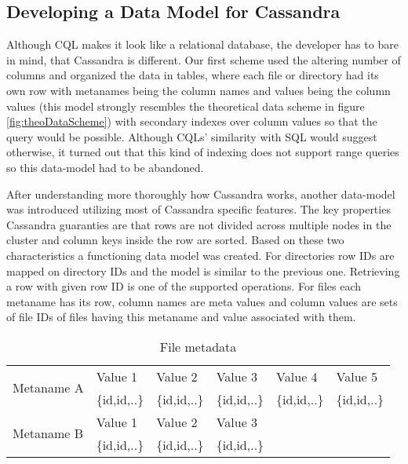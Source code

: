 \subsection{Developing a Data Model for Cassandra}

Although CQL makes it look like a relational database, the developer has to bare in mind, that
Cassandra is different. Our first scheme used the altering number of columns and organized the 
data in tables, where each file or directory had its own row with metanames being the column
names and values being the column values (this model strongly resembles the theoretical data 
scheme in figure \ref{fig:theoDataScheme}) with secondary indexes over column values so that 
the query would be possible. Although CQLs' similarity with SQL would suggest otherwise, 
it turned out that this kind of indexing does not support range queries so this data-model
had to be abandoned. 

After understanding more thoroughly how Cassandra works, another data-model was introduced 
utilizing most of Cassandra specific features. The key properties Cassandra guaranties are that 
rows are not divided across multiple nodes in the cluster and column keys inside the row
are sorted. Based on these two characteristics a functioning data model was created. For  
directories row IDs are mapped on directory IDs and the model is similar to the previous one. 
Retrieving a row with given row ID is one of the supported operations.
For files each metaname has its row, column names are meta values and column values are sets of 
file IDs of files having this metaname and value associated with them. 

\begin{table}[h]
\centering
\begin{tabular}{|l|l|l|l|ll}
\hline
\multirow{2}{*}{Metaname A} & Value 1      & Value 2      & Value 3      & \multicolumn{1}{l|}{Value 4}      & \multicolumn{1}{l|}{Value 5}      \\ \cline{2-6}
                            & \{id,id,..\} & \{id,id,..\} & \{id,id,..\} & \multicolumn{1}{l|}{\{id,id,..\}} & \multicolumn{1}{l|}{\{id,id,..\}} \\ \hline
\multirow{2}{*}{Metaname B} & Value 1      & Value 2      & Value 3      &                                   &                                   \\ \cline{2-4}
                            & \{id,id,..\} & \{id,id,..\} & \{id,id,..\} &                                   &                                   \\ \cline{1-4}
\end{tabular}
\caption{File metadata}
\label{tab:fileMeta}
\end{table}

